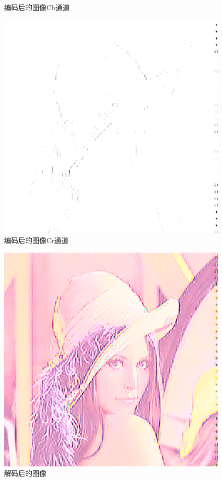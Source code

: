 \documentclass{article}
\numberwithin {equation}{section}
\begin{document}
\begin{spacing}{1.25}
\begin{figure}[H]
    \caption{编码后的图像Cb通道}
    \label{Cb channal image}
  \end{figure}
  \begin{figure}[H]
    \centering
    \includegraphics[scale=0.4]{../src/test/Cr_channal.jpg}
    \caption{编码后的图像Cr通道}
    \label{Cr channal image}
  \end{figure}
  \begin{figure}[H]
    \centering
    \includegraphics[scale=0.4]{../src/test/decode.jpg}
    \caption{解码后的图像}
    \label{decode image}
  \end{figure}


\end{spacing}
\end{document}
